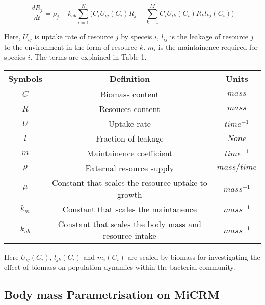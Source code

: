 \documentclass{article}
\begin{document}
 \begin{equation}
    \frac{dR_j}{dt} = \rho_j - k_{ab} \sum^N_{i=1} \bigg ( C_i U_{ij}(C_i) R_j - \sum^M_{k=1} C_i U_{ik}(C_i) R_k l_{kj}(C_i) \bigg )
 \end{equation}

 Here, $U_{ij}$ is uptake rate of resource $j$ by speceis $i$, $l_{ij}$ is the leakage of resource $j$ to the environment in the form of resource $k$. $m_i$ is the maintainence required for species $i$. The terms are explained in Table 1. 

 \begin{center}
    \begin{tabular}{ |c|c|c| } 
     \hline
     Symbols & Definition & Units \\

     \hline 
     $C$ & Biomass content & $mass$ \\ 
     $R$ & Resouces content & $mass$ \\
     $U$ & Uptake rate & $time^{-1}$ \\
     $l$ & Fraction of leakage & $None$ \\
     $m$ & Maintainence coefficient & $time^{-1}$ \\
     $\rho$ & External resource supply & $mass/time$ \\
     $\mu$ &  Constant that scales the resource uptake to growth & $mass^{-1}$ \\
     $k_m$ & Constant that scales the maintanence & $mass^{-1}$ \\
     $k_{ab}$ & Constant that scales the body mass and resource intake & $mass^{-1}$ \\
     \hline

    \end{tabular}
    \end{center}

Here $U_{ij}(C_i)$, $l_{jk}(C_i)$ and $m_i(C_i)$ are scaled by biomass for investigating the effect of biomass on population dynamics within the bacterial community. 

\subsection{Body mass Parametrisation on MiCRM}
\end{document}
